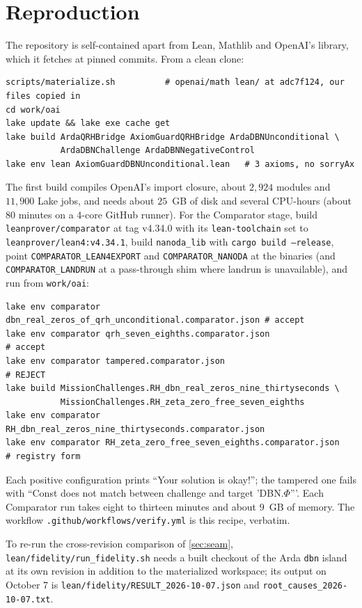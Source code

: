 \documentclass[11pt]{article}
\theoremstyle{definition}
\begin{document}
\appendix

\section{Reproduction}\label{app:repro}

The repository \cite{Repo} is self-contained apart from Lean, Mathlib and OpenAI's library, which it fetches at pinned commits. From a clean clone:
\begin{verbatim}
scripts/materialize.sh          # openai/math lean/ at adc7f124, our files copied in
cd work/oai
lake update && lake exe cache get
lake build ArdaQRHBridge AxiomGuardQRHBridge ArdaDBNUnconditional \
           ArdaDBNChallenge ArdaDBNNegativeControl
lake env lean AxiomGuardDBNUnconditional.lean   # 3 axioms, no sorryAx
\end{verbatim}
The first build compiles OpenAI's import closure, about $2{,}924$ modules and $11{,}900$ Lake jobs, and needs about $25$~GB of disk and several CPU-hours (about $80$ minutes on a 4-core GitHub runner). For the Comparator stage, build \texttt{leanprover/comparator} at tag v4.34.0 with its \texttt{lean-toolchain} set to \texttt{leanprover/lean4:v4.34.1}, build \texttt{nanoda\_lib} with \texttt{cargo build --release}, point \texttt{COMPARATOR\_LEAN4EXPORT} and \texttt{COMPARATOR\_NANODA} at the binaries (and \texttt{COMPARATOR\_LANDRUN} at a pass-through shim where landrun is unavailable), and run from \texttt{work/oai}:
\begin{verbatim}
lake env comparator dbn_real_zeros_of_qrh_unconditional.comparator.json # accept
lake env comparator qrh_seven_eighths.comparator.json                   # accept
lake env comparator tampered.comparator.json                            # REJECT
lake build MissionChallenges.RH_dbn_real_zeros_nine_thirtyseconds \
           MissionChallenges.RH_zeta_zero_free_seven_eighths
lake env comparator RH_dbn_real_zeros_nine_thirtyseconds.comparator.json
lake env comparator RH_zeta_zero_free_seven_eighths.comparator.json      # registry form
\end{verbatim}
Each positive configuration prints ``Your solution is okay!''; the tampered one fails with ``Const does not match between challenge and target 'DBN.$\Phi$'''. Each Comparator run takes eight to thirteen minutes and about $9$~GB of memory. The workflow \texttt{.github/workflows/verify.yml} is this recipe, verbatim.

To re-run the cross-revision comparison of \cref{sec:seam}, \texttt{lean/fidelity/run\_fidelity.sh} needs a built checkout of the Arda \texttt{dbn} island at its own revision in addition to the materialized workspace; its output on October 7 is \texttt{lean/fidelity/RESULT\_2026-10-07.json} and \texttt{root\_causes\_2026-10-07.txt}.
\end{document}

